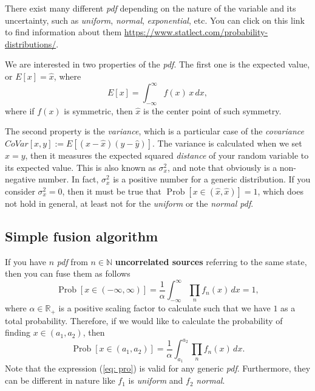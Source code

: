\documentclass[11pt,a4paper]{article}
\begin{document}
There exist many different \emph{pdf} depending on the nature of the variable and its uncertainty, such as \emph{uniform}, \emph{normal}, \emph{exponential}, etc. You can click on this link to find information about them \url{https://www.statlect.com/probability-distributions/}.

We are interested in two properties of the \emph{pdf}. The first one is the expected value, or $E[x] = \hat x$, where
\begin{equation}
	E[x] = \int_{-\infty}^{\infty} f(x)\, x \,dx, \label{eq: ep}
\end{equation}
where if $f(x)$ is symmetric, then $\hat x$ is the center point of such symmetry.

The second property is the \emph{variance}, which is a particular case of the \emph{covariance} $CoVar[x,y] := E[(x-\hat x)(y-\hat y)]$. The variance is calculated when we set $x=y$, then it measures the expected squared \emph{distance} of your random variable to its expected value. This is also known as $\sigma_x^2$, and note that obviously is a non-negative number. In fact, $\sigma_x^2$ is a positive number for a generic distribution. If you consider $\sigma_x^2 = 0$, then it must be true that  $\operatorname{Prob}[x\in (\hat x,\hat x)] = 1$, which does not hold in general, at least not for the \emph{uniform} or the \emph{normal pdf}.

\subsection{Simple fusion algorithm}
If you have $n$ \emph{pdf} from $n\in\mathbb{N}$ {\bf uncorrelated sources} referring to the same state, then you can fuse them as follows
\begin{equation}
	\operatorname{Prob}[x\in (-\infty,\infty)] = \frac{1}{\alpha}\int_{-\infty}^{\infty} \prod_n f_n(x) \, dx = 1, \label{eq: fus}
\end{equation}
where $\alpha\in\mathbb{R}_+$ is a positive scaling factor to calculate such that we have $1$ as a total probability. Therefore, if we would like to calculate the probability of finding $x\in(a_1,a_2)$, then
\begin{equation}
	\operatorname{Prob}[x\in (a_1,a_2)] = \frac{1}{\alpha}\int_{a_1}^{a_2} \prod_n f_n(x) \, dx. \label{eq: pro}
\end{equation}
Note that the expression (\ref{eq: pro}) is valid for any generic \emph{pdf}. Furthermore, they can be different in nature like $f_1$ is \emph{uniform} and $f_2$ \emph{normal}.
\end{document}
